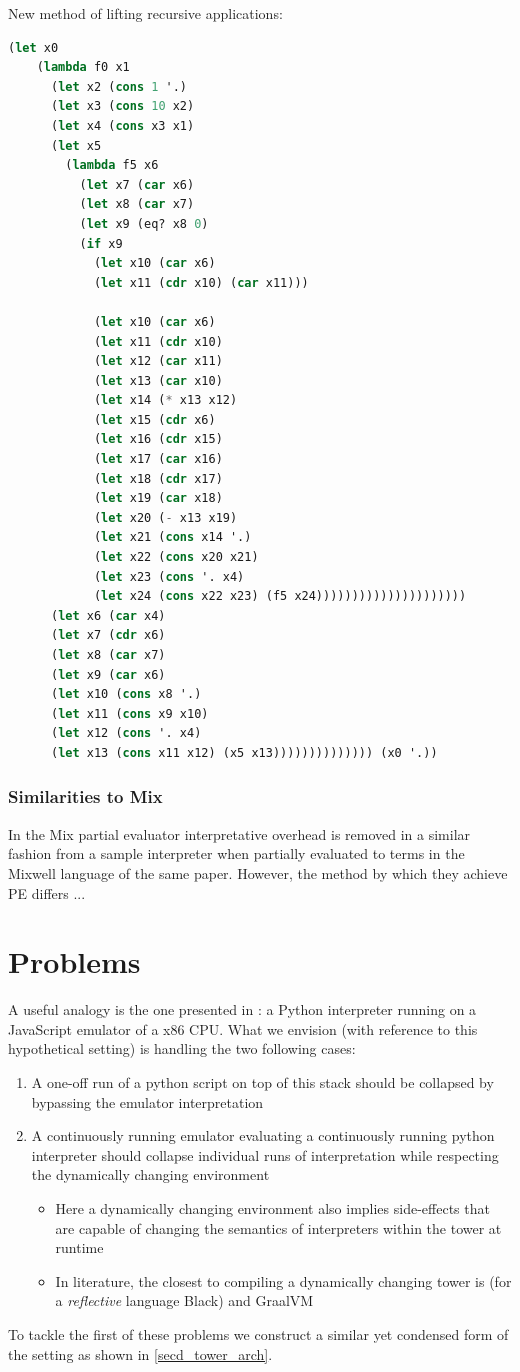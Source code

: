 \documentclass{article}
\theoremstyle{definition}
\begin{document}
New method of lifting recursive applications:
\begin{lstlisting}[language=Lisp]
	(let x0
	(lambda f0 x1
	  (let x2 (cons 1 '.)
	  (let x3 (cons 10 x2)
	  (let x4 (cons x3 x1)
	  (let x5
		(lambda f5 x6
		  (let x7 (car x6)
		  (let x8 (car x7)
		  (let x9 (eq? x8 0)
		  (if x9
			(let x10 (car x6)
			(let x11 (cdr x10) (car x11)))
  
			(let x10 (car x6)
			(let x11 (cdr x10)
			(let x12 (car x11)
			(let x13 (car x10)
			(let x14 (* x13 x12)
			(let x15 (cdr x6)
			(let x16 (cdr x15)
			(let x17 (car x16)
			(let x18 (cdr x17)
			(let x19 (car x18)
			(let x20 (- x13 x19)
			(let x21 (cons x14 '.)
			(let x22 (cons x20 x21)
			(let x23 (cons '. x4)
			(let x24 (cons x22 x23) (f5 x24)))))))))))))))))))))
	  (let x6 (car x4)
	  (let x7 (cdr x6)
	  (let x8 (car x7)
	  (let x9 (car x6)
	  (let x10 (cons x8 '.)
	  (let x11 (cons x9 x10)
	  (let x12 (cons '. x4)
	  (let x13 (cons x11 x12) (x5 x13)))))))))))))) (x0 '.))
\end{lstlisting}

\subsubsection{Similarities to Mix}
In the Mix partial evaluator \cite{jones1989mix} interpretative overhead is removed in a similar fashion from a sample interpreter when partially evaluated to terms in the Mixwell language of the same paper. However, the method by which they achieve PE differs ...

\section{Problems}
A useful analogy is the one presented in \cite{amin2017collapsing}: a Python interpreter running on a JavaScript emulator of a x86 CPU. What we envision (with reference to this hypothetical setting) is handling the two following cases:
\begin{enumerate}
	\item A one-off run of a python script on top of this stack should be collapsed by bypassing the emulator interpretation
	\item A continuously running emulator evaluating a continuously running python interpreter should collapse individual runs of interpretation while respecting the dynamically changing environment
	\begin{itemize}
		\item Here a dynamically changing environment also implies side-effects that are capable of changing the semantics of interpreters within the tower at runtime
		\item In literature, the closest to compiling a dynamically changing tower is \cite{asai1997partial, amin2017collapsing} (for a \textit{reflective} language Black) and GraalVM \cite{wurthinger2013one}
	\end{itemize}
\end{enumerate}
To tackle the first of these problems we construct a similar yet condensed form of the setting as shown in \ref{secd_tower_arch}.
\end{document}
